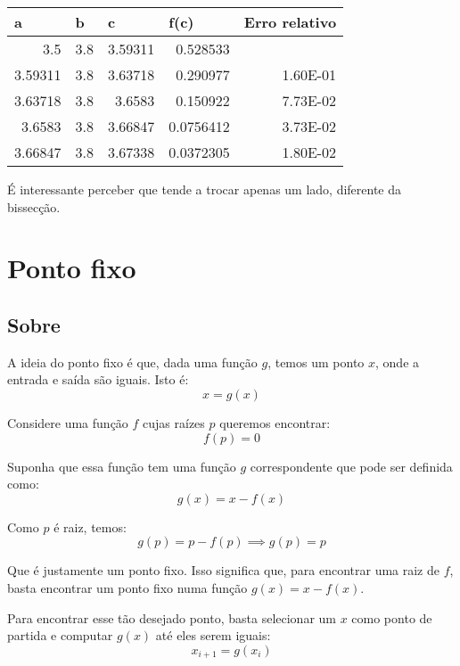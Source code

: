 \documentclass[12pt]{article}
\begin{document}
\begin{table}[H]
\centering
\begin{tabular}{@{}rrrrr@{}}
\toprule
\multicolumn{1}{l}{a} & \multicolumn{1}{l}{b} & \multicolumn{1}{l}{c} & \multicolumn{1}{l}{f(c)} & \multicolumn{1}{l}{Erro relativo} \\ \midrule
3.5                   & 3.8                   & 3.59311               & 0.528533                 & \multicolumn{1}{l}{}              \\
3.59311               & 3.8                   & 3.63718               & 0.290977                 & 1.60E-01                          \\
3.63718               & 3.8                   & 3.6583                & 0.150922                 & 7.73E-02                          \\
3.6583                & 3.8                   & 3.66847               & 0.0756412                & 3.73E-02                          \\
3.66847               & 3.8                   & 3.67338               & 0.0372305                & 1.80E-02                         \\ \bottomrule
\end{tabular}
\end{table}

É interessante perceber que tende a trocar apenas um lado, diferente da bissecção.

\section{Ponto fixo}
\subsection{Sobre}
A ideia do ponto fixo é que, dada uma função \(g\), temos um ponto \(x\), onde a entrada e saída são iguais. Isto é:
\[x = g(x)\]

Considere uma função \(f\) cujas raízes \(p\) queremos encontrar:
\[f(p) = 0\]

Suponha que essa função tem uma função \(g\) correspondente que pode ser definida como:
\[g(x) = x - f(x)\]

Como \(p\) é raiz, temos:
\[g(p) = p - f(p) \implies g(p) = p\]

Que é justamente um ponto fixo. Isso significa que, para encontrar uma raiz de \(f\), basta encontrar um ponto fixo numa função \(g(x) = x - f(x)\).

Para encontrar esse tão desejado ponto, basta selecionar um \(x\) como ponto de partida e computar \(g(x)\) até eles serem iguais: 
\[x_{i+1} = g(x_i)\]
\end{document}

